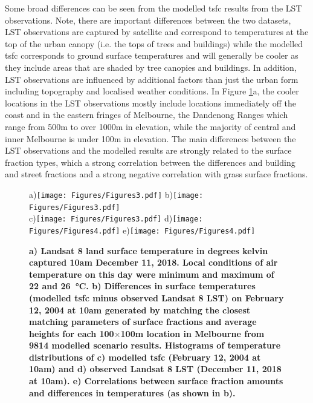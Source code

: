 \documentclass[final,3p,times,authoryear]{elsarticle}
\begin{document}
Some broad differences can be seen from the modelled \gls{tsfc} results from the LST observations. Note, there are important differences between the two datasets, LST observations are captured by satellite and correspond to temperatures at the top of the urban canopy (i.e. the tops of trees and buildings) while the modelled \gls{tsfc} corresponds to ground surface temperatures and will generally be cooler as they include areas that are shaded by tree canopies and buildings. In addition, LST observations are influenced by additional factors than just the urban form including topography and localised weather conditions. In Figure \ref{fig:Melb_TSFC12_85}a, the cooler locations in the LST observations mostly include locations immediately off the coast and in the eastern fringes of Melbourne, the Dandenong Ranges which range from 500m to over 1000m in elevation, while the majority of central and inner Melbourne is under 100m in elevation. The main differences between the LST observations and the modelled results are strongly related to the surface fraction types, which a strong correlation between the differences and building and street fractions and a strong negative correlation with grass surface fractions. 



\begin{figure}
\centering
a)\texttt{[image: Figures/Figures3.pdf]}
b)\texttt{[image: Figures/Figures3.pdf]}\\
c)\texttt{[image: Figures/Figures3.pdf]}
d)\texttt{[image: Figures/Figures4.pdf]}
e)\texttt{[image: Figures/Figures4.pdf]}
\caption{\bf a) Landsat 8 land surface temperature in degrees kelvin captured 10am December 11, 2018. Local conditions of air temperature on this day were minimum and maximum of 22 and 26\SI{}{\degreeCelsius}. b) Differences in surface temperatures (modelled \gls{tsfc} minus observed Landsat 8 LST) on February 12, 2004 at 10am generated by matching the closest matching parameters of surface fractions and average heights for each 100$\times$100m location in Melbourne from 9814 modelled scenario results. Histograms of temperature distributions of c) modelled \gls{tsfc} (February 12, 2004 at 10am) and d) observed Landsat 8 LST (December 11, 2018 at 10am). e) Correlations between surface fraction amounts and differences in temperatures (as shown in b).}
 \label{fig:Melb_TSFC12_85}
\end{figure}
\end{document}
